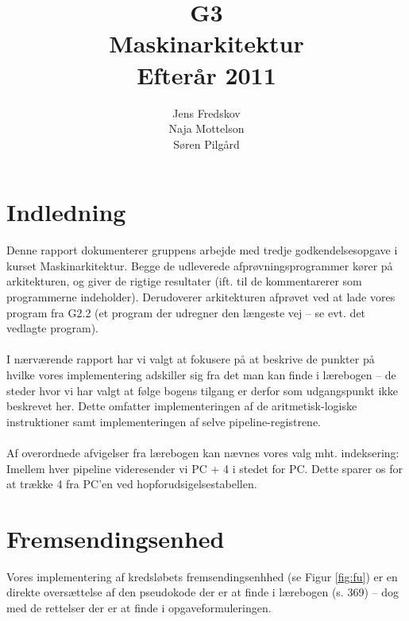 \documentclass[10pt,a4paper,danish]{article}
\title{G3\\Maskinarkitektur\\Efterår 2011}
\author{Jens Fredskov\\ Naja Mottelson\\Søren Pilgård}
\begin{document}
\maketitle
\newpage

\tableofcontents
\newpage

\section{Indledning}
Denne rapport dokumenterer gruppens arbejde med tredje godkendelsesopgave i kurset 
Maskinarkitektur. Begge de udleverede afprøvningsprogrammer kører på
arkitekturen, og giver de rigtige resultater (ift. til de kommentarerer som
programmerne indeholder). Derudoverer arkitekturen afprøvet ved at lade vores
program fra G2.2 (et program der udregner den længeste vej -- se evt. det
vedlagte program).

\paragraph{}
I nærværende rapport har vi valgt at fokusere på at beskrive de punkter på 
hvilke vores implementering adskiller sig fra det man kan finde i lærebogen -- 
de steder hvor vi har valgt at følge bogens tilgang er derfor som udgangspunkt
ikke beskrevet her. Dette omfatter implementeringen af de aritmetisk-logiske
instruktioner samt implementeringen af selve pipeline-registrene.  

\paragraph{}
Af overordnede afvigelser fra lærebogen kan nævnes vores valg mht. indeksering:
Imellem hver pipeline videresender vi PC + 4 i stedet for PC. Dette sparer os 
for at trække 4 fra PC'en ved hopforudsigelsestabellen. 

\paragraph{}

\section{Fremsendingsenhed}
Vores implementering af kredsløbets fremsendingsenhhed (se Figur \ref{fig:fu}) er 
en direkte oversættelse af den pseudokode der er at finde i lærebogen (s. 369)
-- dog med de rettelser der er at finde i opgaveformuleringen. 
\end{document}
